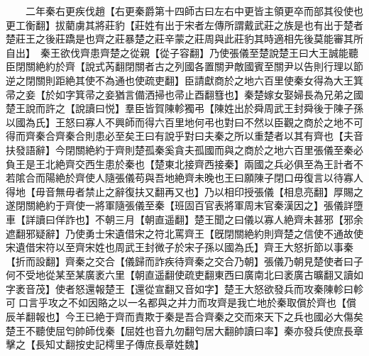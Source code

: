 　　二年秦右更疾伐趙【右更秦爵第十四師古曰左右中更皆主領更卒而部其役使也更工衡翻】拔藺虜其將莊豹【莊姓有出于宋者左傳所謂戴武莊之族是也有出于楚者楚莊王之後莊蹻是也齊之莊暴楚之莊辛蒙之莊周與此莊豹其時適相先後莫能審其所自出】　秦王欲伐齊患齊楚之從親【從子容翻】乃使張儀至楚說楚王曰大王誠能聽臣閉關絶約於齊【說式芮翻閉關者古之列國各置關尹敵國賓至關尹以告則行理以節逆之閉關則距絶其使不為通也使疏吏翻】臣請獻商於之地六百里使秦女得為大王箕帚之妾【於如字箕帚之妾猶言備洒掃也帚止酉翻篲也】秦楚嫁女娶婦長為兄弟之國楚王說而許之【說讀曰悦】羣臣皆賀陳軫獨弔【陳姓出於舜周武王封舜後于陳子孫以國為氏】王怒曰寡人不興師而得六百里地何弔也對曰不然以臣觀之商於之地不可得而齊秦合齊秦合則患必至矣王曰有說乎對曰夫秦之所以重楚者以其有齊也【夫音扶發語辭】今閉關絶約于齊則楚孤秦奚貪夫孤國而與之商於之地六百里張儀至秦必負王是王北絶齊交西生患於秦也【楚東北接齊西接秦】兩國之兵必俱至為王計者不若隂合而陽絶於齊使人隨張儀苟與吾地絶齊未晚也王曰願陳子閉口毋復言以待寡人得地【毋音無毋者禁止之辭復扶又翻再又也】乃以相印授張儀【相息亮翻】厚賜之遂閉關絶約于齊使一將軍隨張儀至秦【班固百官表將軍周末官秦漢因之】張儀詳墮車【詳讀曰佯詐也】不朝三月【朝直遥翻】楚王聞之曰儀以寡人絶齊未甚邪【邪余遮翻邪疑辭】乃使勇士宋遺借宋之符北罵齊王【旣閉關絶約則齊楚之信使不通故使宋遺借宋符以至齊宋姓也周武王封微子於宋子孫以國為氏】齊王大怒折節以事秦【折而設翻】齊秦之交合【儀歸而詐疾待齊秦之交合乃朝】張儀乃朝見楚使者曰子何不受地從某至某廣袤六里【朝直遥翻使疏吏翻東西曰廣南北曰袤廣古曠翻又讀如字袤音茂】使者怒還報楚王【還從宣翻又音如字】楚王大怒欲發兵而攻秦陳軫曰軫可口言乎攻之不如因賂之以一名都與之并力而攻齊是我亡地於秦取償於齊也【償辰羊翻報也】今王已絶于齊而責欺于秦是吾合齊秦之交而來天下之兵也國必大傷矣楚王不聽使屈匄帥師伐秦【屈姓也音九勿翻匄居大翻帥讀曰率】秦亦發兵使庶長章擊之【長知丈翻按史記樗里子傳庶長章姓魏】

